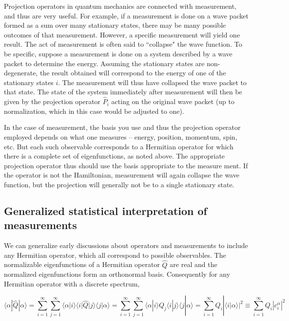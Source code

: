 Projection operators in quantum mechanics are connected with measurement, and thus are very
useful. For example, if a measurement is done on a wave packet formed as a sum
over many stationary states, there may be many possible outcomes of that
measurement. However, a specific
measurement will yield one result. The act of measurement is often said to
``collapse" the wave function. To be specific, suppose a measurement is done on
a system described by a wave packet to determine the energy. Assuming the
stationary states are non-degenerate, the result obtained will correspond to
the energy of one of the stationary states $i$. The measurement will thus have
collapsed the wave packet to that state. The state of the system immediately
after measurement will then be given by the projection operator $\hat{P}_i$
acting on the original wave packet (up to normalization, which in this case
would be adjusted to one).

In the case of measurement, the basis you use and thus the projection operator
employed depends on what one measures -- energy, position, momentum, spin,
etc. But each such observable
corresponds to a Hermitian operator for which there is a complete set of eigenfunctions, as noted
above. The appropriate projection operator thus should use the basis
appropriate to the measure ment. If the operator is not the Hamiltonian,
measurement will again collapse the wave function,
but the projection will generally not be to a single stationary state.


\subsection{Generalized statistical interpretation of measurements} 


We can generalize early discussions about operators and measurements to include
any Hermitian operator, which all correspond to possible observables. The
normalizable eigenfunctions of a Hermitian operator $\hat{Q}$ are real and the
normalized eigenfunctions form an orthonormal basis. Consequently for any
Hermitian operator with a discrete spectrum, 

\[
\langle \alpha | \hat{Q} | \alpha \rangle = \sum_{i=1}^{\infty}
\sum_{j=1}^{\infty} \langle \alpha | i\rangle \langle i | \hat{Q} | j\rangle
\langle j | \alpha \rangle = \sum_{i=1}^{\infty} \sum_{j=1}^{\infty} \langle
\alpha | i \rangle Q_j \langle i | j \rangle \langle j | \alpha \rangle
= \sum_{i=1}^{\infty} Q_i | \langle i | \alpha \rangle|^2 \equiv
\sum_{i=1}^{\infty} Q_i |c_i^\alpha |^2  
\] \vspace{3px}

